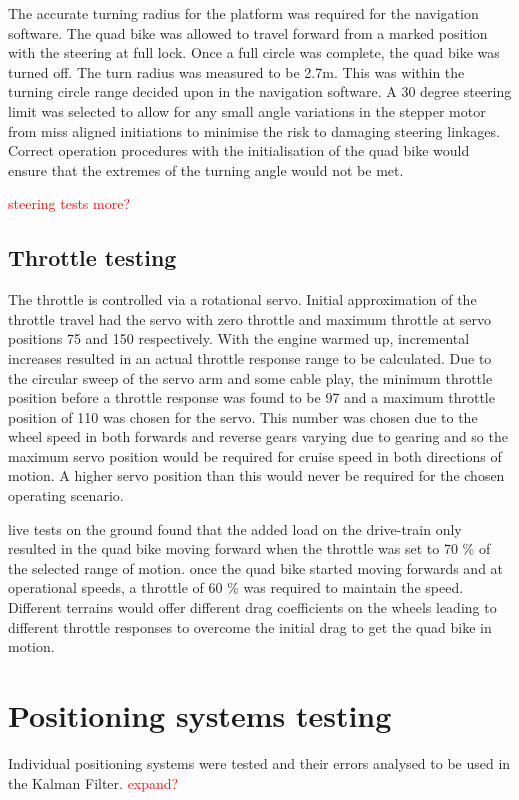 \documentclass[main.tex]{subfiles}
\begin{document}
The accurate turning radius for the platform was required for the navigation software. The quad bike was allowed to travel forward from a marked position with the steering at full lock. Once a full circle was complete, the quad bike was turned off. The turn radius was measured to be 2.7m. This was within the turning circle range decided upon in the navigation software. A 30 degree steering limit was selected to allow for any small angle variations in the stepper motor from miss aligned initiations to minimise the risk to damaging steering linkages. Correct operation procedures with the initialisation of the quad bike would ensure that the extremes of the turning angle would not be met. 

\textcolor{red}{steering tests more?}

\subsection{Throttle testing}
The throttle is controlled via a rotational servo. Initial approximation of the throttle travel had the servo with zero throttle and maximum throttle at servo positions 75 and 150 respectively. With the engine warmed up, incremental increases resulted in an actual throttle response range to be calculated. Due to the circular sweep of the servo arm and some cable play, the minimum throttle position before a throttle response was found to be 97 and a maximum throttle position of 110 was chosen for the servo. This number was chosen due to the wheel speed in both forwards and reverse gears varying due to gearing and so the maximum servo position would be required for cruise speed in both directions of motion. A higher servo position than this would never be required for the chosen operating scenario.

live tests on the ground found that the added load on the drive-train only resulted in the quad bike moving forward when the throttle was set to 70 \% of the selected range of motion. once the quad bike started moving forwards and at operational speeds, a throttle of 60 \% was required to maintain the speed. Different terrains would offer different drag coefficients on the wheels leading to different throttle responses to overcome the initial drag to get the quad bike in motion. 

\section{Positioning systems testing}
Individual positioning systems were tested and their errors analysed to be used in the Kalman Filter.
\textcolor{red}{expand?}
\end{document}
